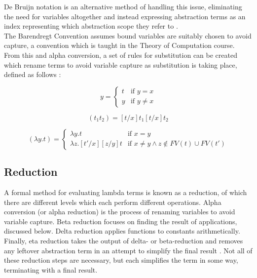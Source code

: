 \documentclass[a4paper,11pt]{report}
\begin{document}
De Bruijn notation is an alternative method of handling this issue, eliminating the need for variables altogether and instead expressing abstraction terms as an index representing which abstraction scope they refer to \cite{Kamareddine2000}.\\

The Barendregt Convention assumes bound variables are suitably chosen to avoid capture, a convention which is taught in the Theory of Computation course. From this and alpha conversion, a set of rules for substitution can be created which rename terms to avoid variable capture as substitution is taking place, defined as follows \cite{Acar2008}:

\begin{equation}
[t/x]y=\begin{cases}
t & \text{if $y=x$}\\
y & \text{if $y\ne x$}
\end{cases}
\end{equation}

\begin{equation}
[t/x](t_1t_2)=[t/x]t_1[t/x]t_2
\end{equation}

\begin{equation}
[t'/x](\lambda y.t)=\begin{cases}
\lambda y.t & \text{if $x=y$}\\
\lambda z.[t'/x][z/y]t & \text{if $x\ne y \land z\notin FV(t) \cup FV(t')$}
\end{cases}
\end{equation}

\subsection{Reduction}

A formal method for evaluating lambda terms is known as a reduction, of which there are different levels which each perform different operations. Alpha conversion (or alpha reduction) \cite{Horowitz2013} is the process of renaming variables to avoid variable capture. Beta reduction focuses on finding the result of applications, discussed below. Delta reduction applies functions to constants arithmetically. Finally, eta reduction takes the output of delta- or beta-reduction and removes any leftover abstraction term in an attempt to simplify the final result \cite{Sookocheff2018Eta}. Not all of these reduction steps are necessary, but each simplifies the term in some way, terminating with a final result.
\end{document}
